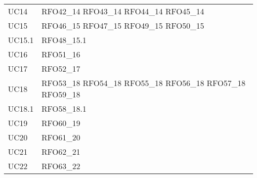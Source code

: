 \begin{longtable}{|C{6cm} C{6cm}|}
    UC14 & RFO42\_14 \newline RFO43\_14 \newline RFO44\_14 \newline RFO45\_14 \\
    UC15 & RFO46\_15 \newline RFO47\_15 \newline RFO49\_15 \newline RFO50\_15 \\
    UC15.1 & RFO48\_15.1 \\
    UC16 & RFO51\_16 \\
    UC17 & RFO52\_17 \\
    UC18 & RFO53\_18 \newline RFO54\_18 \newline RFO55\_18 \newline RFO56\_18 \newline RFO57\_18 \newline RFO59\_18 \\
    UC18.1 & RFO58\_18.1 \\
    UC19 & RFO60\_19 \\
    UC20 & RFO61\_20 \\
    UC21 & RFO62\_21 \\
    UC22 & RFO63\_22 \\

\end{longtable}
